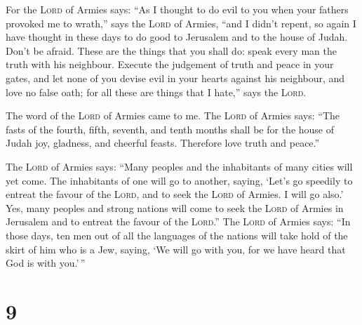  For the \textsc{Lord} of Armies says: ``As I thought to
do evil to you when your fathers provoked me to wrath,'' says the
\textsc{Lord} of Armies, ``and I didn't repent,  so again
I have thought in these days to do good to Jerusalem and to the house of
Judah. Don't be afraid.  These are the things that you
shall do: speak every man the truth with his neighbour. Execute the
judgement of truth and peace in your gates,  and let none
of you devise evil in your hearts against his neighbour, and love no
false oath; for all these are things that I hate,'' says the
\textsc{Lord}.

 The word of the \textsc{Lord} of Armies came to me.
 The \textsc{Lord} of Armies says: ``The fasts of the
fourth, fifth, seventh, and tenth months shall be for the house of Judah
joy, gladness, and cheerful feasts. Therefore love truth and peace.''

 The \textsc{Lord} of Armies says: ``Many peoples and the
inhabitants of many cities will yet come.  The
inhabitants of one will go to another, saying, `Let's go speedily to
entreat the favour of the \textsc{Lord}, and to seek the \textsc{Lord}
of Armies. I will go also.'  Yes, many peoples and strong
nations will come to seek the \textsc{Lord} of Armies in Jerusalem and
to entreat the favour of the \textsc{Lord}.''  The
\textsc{Lord} of Armies says: ``In those days, ten men out of all the
languages of the nations will take hold of the skirt of him who is a
Jew, saying, `We will go with you, for we have heard that God is with
you.'\,''

\hypertarget{section-8}{%
\section{9}\label{section-8}}

